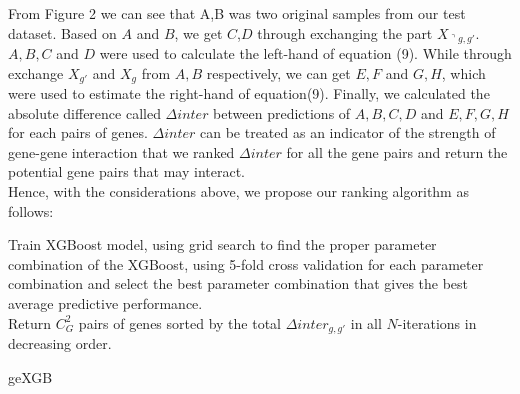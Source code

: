 \documentclass[11pt]{article}
\theoremstyle{plain}
\theoremstyle{definition}
\theoremstyle{remark}
\begin{document}
\noindent From Figure 2 we can see that A,B was two original samples from our test dataset. Based on $A$ and $B$, we get $C$,$D$ through exchanging the part $X_{\urcorner g,g'}$. $A,B,C$ and $D$ were used to calculate the left-hand of equation (9). While through exchange $X_{g'}$ and $X_g$ from $A,B$ respectively, we can get $E,F$ and $G,H$, which were used to estimate the right-hand of equation(9). Finally, we calculated the absolute difference called $\Delta inter$ between predictions of $A,B,C,D$ and $E,F,G,H$ for each pairs of genes. $\Delta inter$ can be treated as an indicator of the strength of gene-gene interaction that we ranked $\Delta inter$ for all the gene pairs and return the potential gene pairs that may interact.\\

\noindent Hence, with the considerations above, we propose our ranking algorithm as follows:

\begin{algorithm}[H]
\SetAlgoLined
{}
Train XGBoost model, using grid search to find the proper parameter combination of the XGBoost, using 5-fold cross validation for each parameter combination and select the best parameter combination that gives the best average predictive performance.\\
Return $C^2_G$ pairs of genes sorted by the total $\Delta inter_{g,g'}$ in all $N$-iterations in decreasing order.
 \caption{geXGB}
\end{algorithm}
\end{document}
